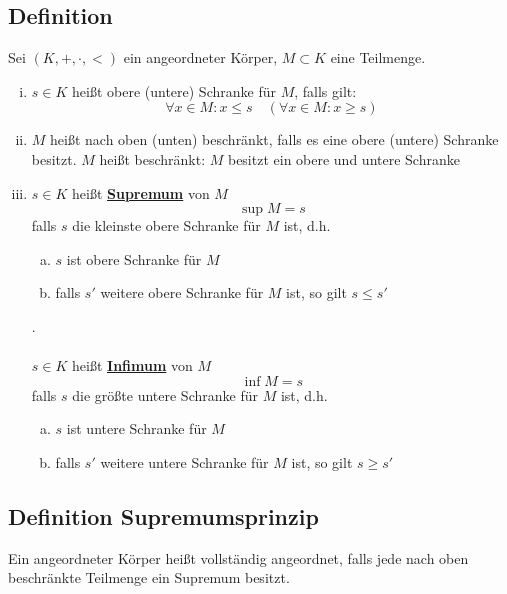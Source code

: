 \subsection{Definition} %
\label{sub:definition}
Sei $(K,+, \cdot,<)$ ein angeordneter Körper, $M \subset K$ eine Teilmenge.
\begin{enumerate}[(i)]
	\item $s \in K$ heißt obere (untere) Schranke für $M$, falls gilt:
	\[
		\forall x \in M : x \leq s \quad (\forall x \in M : x \geq s)
	\]
	\item $M$ heißt nach oben (unten) beschränkt, falls es eine obere (untere) Schranke besitzt. 
	$M$ heißt beschränkt: $M$ besitzt ein obere und untere Schranke
	\item $s \in K$ heißt \underline{\textbf{Supremum}} von $M$
	\[
		\sup M = s
	\]
	falls $s$ die kleinste obere Schranke für $M$ ist, d.h.
	\begin{enumerate}[a)]
		\item $s$ ist obere Schranke für $M$
		\item falls $s'$ weitere obere Schranke für $M$ ist, so gilt $s\leq s'$
	\end{enumerate} . \\
	\vspace{\baselineskip}\\
	$s \in K$ heißt \underline{\textbf{Infimum}} von $M$
	\[
		\inf M =s
	\]
	falls $s$ die größte untere Schranke für $M$ ist, d.h.
	\begin{enumerate}[a)]
		\item $s$ ist untere Schranke für $M$
		\item falls $s'$ weitere untere Schranke für $M$ ist, so gilt $s \geq s'$
	\end{enumerate}
\end{enumerate}

\subsection{Definition Supremumsprinzip} %
\label{sub:definition_supremumsprinzip}
Ein angeordneter Körper heißt vollständig angeordnet, falls jede nach oben beschränkte Teilmenge ein Supremum besitzt.

